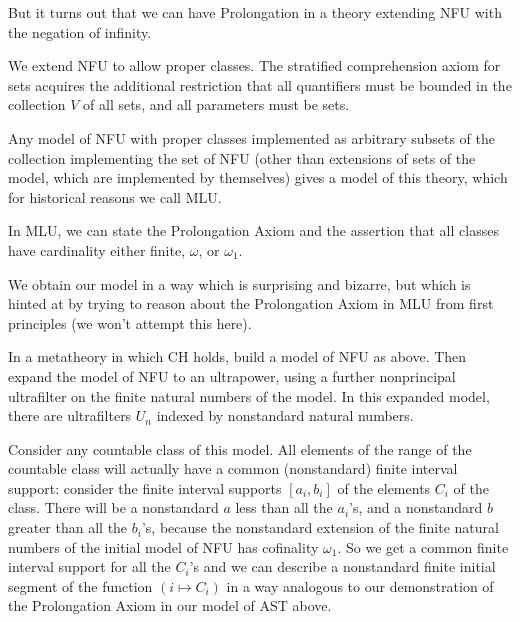 \documentclass{slides}
\begin{document}
\begin{slide}

But it turns out that we can have Prolongation in a theory extending NFU with the negation of infinity.

We extend NFU to allow proper classes.  The stratified comprehension axiom for sets acquires the additional restriction
that all quantifiers must be bounded in the collection $V$ of all sets, and all parameters must be sets.

Any model of NFU with proper classes implemented as arbitrary subsets of the collection implementing the set of NFU (other than extensions of sets of the model, which are implemented by themselves) gives a model of this theory, which for historical reasons we call MLU.

\end{slide}

\begin{slide}

In MLU, we can state the Prolongation Axiom and the assertion that all classes have cardinality either finite, $\omega$, or $\omega_1$.

We obtain our model in a way which is surprising and bizarre, but which is hinted at by trying to reason about the Prolongation Axiom in MLU from first principles (we won't attempt this here).

In a metatheory in which CH holds, build a model of NFU as above.  Then expand the model of NFU to an ultrapower, using a further nonprincipal ultrafilter on the finite natural numbers of the model.  In this expanded model, there
are ultrafilters $U_n$ indexed by nonstandard natural numbers.

\end{slide}

\begin{slide}



Consider any countable class of this model.   All elements of the range of the countable class will actually have a common (nonstandard) finite interval support:  consider the finite interval supports $[a_i,b_i]$ of the elements $C_i$ of the class.  There will be a nonstandard $a$ less than all the $a_i$'s, and a nonstandard $b$ greater than all the $b_i$'s, because the nonstandard extension of the finite natural numbers of the initial model of NFU has cofinality $\omega_1$.
So we get a common finite interval support for all the $C_i$'s and we can describe a nonstandard finite initial segment of the function $(i \mapsto C_i)$ in a way analogous to our demonstration of the Prolongation Axiom in our model of AST above.

\end{slide}
\end{document}
